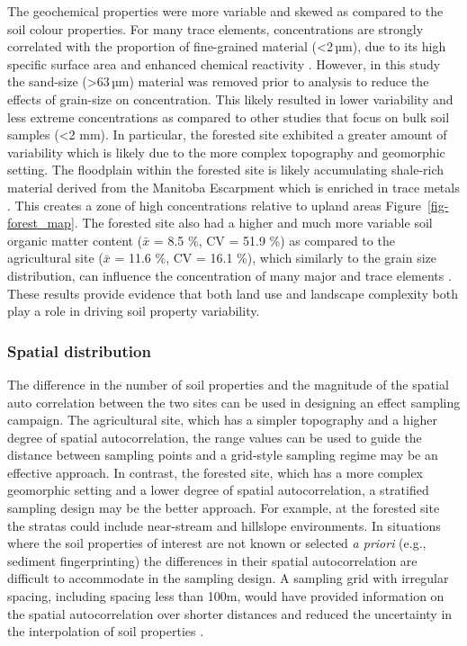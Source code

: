 \documentclass[
  number]{elsarticle}
\begin{document}
The geochemical properties were more variable and skewed as compared to
the soil colour properties. For many trace elements, concentrations are
strongly correlated with the proportion of fine-grained material
(\textless2\,µm), due to its high specific surface area and enhanced
chemical reactivity \citep{horowitz1991}. However, in this study the
sand-size (\textgreater63\,µm) material was removed prior to analysis to
reduce the effects of grain-size on concentration. This likely resulted
in lower variability and less extreme concentrations as compared to
other studies that focus on bulk soil samples (\textless2 mm). In
particular, the forested site exhibited a greater amount of variability
which is likely due to the more complex topography and geomorphic
setting. The floodplain within the forested site is likely accumulating
shale-rich material derived from the Manitoba Escarpment which is
enriched in trace metals \citep{nicolas2011}. This creates a zone of
high concentrations relative to upland areas
Figure~\ref{fig-forest_map}. The forested site also had a higher and
much more variable soil organic matter content (\(\bar{x}\) = 8.5 \%, CV
= 51.9 \%) as compared to the agricultural site (\(\bar{x}\) = 11.6 \%,
CV = 16.1 \%), which similarly to the grain size distribution, can
influence the concentration of many major and trace elements
\citep{horowitz1991}. These results provide evidence that both land use
and landscape complexity both play a role in driving soil property
variability.

\subsubsection{Spatial distribution}\label{spatial-distribution}

The difference in the number of soil properties and the magnitude of the
spatial auto correlation between the two sites can be used in designing
an effect sampling campaign. The agricultural site, which has a simpler
topography and a higher degree of spatial autocorrelation, the range
values can be used to guide the distance between sampling points and a
grid-style sampling regime may be an effective approach. In contrast,
the forested site, which has a more complex geomorphic setting and a
lower degree of spatial autocorrelation, a stratified sampling design
may be the better approach. For example, at the forested site the
stratas could include near-stream and hillslope environments. In
situations where the soil properties of interest are not known or
selected \emph{a priori} (e.g., sediment fingerprinting) the differences
in their spatial autocorrelation are difficult to accommodate in the
sampling design. A sampling grid with irregular spacing, including
spacing less than 100m, would have provided information on the spatial
autocorrelation over shorter distances and reduced the uncertainty in
the interpolation of soil properties \citep{lark2018}.
\end{document}
